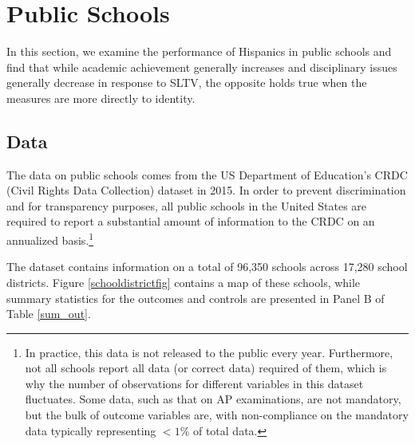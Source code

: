 \documentclass[11pt]{article}
\begin{document}
\section{Public Schools}\label{secschool}

In this section, we examine the performance of Hispanics in public schools and find that while academic achievement generally increases and disciplinary issues generally decrease in response to SLTV, the opposite holds true when the measures are more directly to identity. 

\subsection{Data}

The data on public schools comes from the US Department of Education's CRDC (Civil Rights Data Collection) dataset in 2015. In order to prevent discrimination and for transparency purposes, all public schools in the United States are required to report a substantial amount of information to the CRDC on an annualized basis.\footnote{ In practice, this data is not released to the public every year. Furthermore, not all schools report all data (or correct data) required of them, which is why the number of observations for different variables in this dataset fluctuates. Some data, such as that on AP examinations, are not mandatory, but the bulk of outcome variables are, with non-compliance on the mandatory data typically representing $<1\%$ of total data.} 

The dataset contains information on a total of 96,350 schools across 17,280 school districts. Figure \ref{schooldistrictfig} contains a map of these schools, while summary statistics for the outcomes and controls are presented in Panel B of Table \ref{sum_out}.
\end{document}
